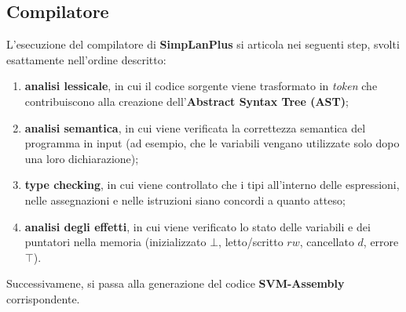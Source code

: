 \documentclass[../../main]{subfiles}
\begin{document}
\subsection{Compilatore}
L'esecuzione del compilatore di \textbf{SimpLanPlus} si articola nei seguenti step, svolti esattamente nell'ordine descritto: 
\begin{enumerate}
    \item \textbf{analisi lessicale}, in cui il codice sorgente viene trasformato in \textit{token} che contribuiscono alla creazione dell'\textbf{Abstract Syntax Tree (AST)};
    \item \textbf{analisi semantica}, in cui viene verificata la correttezza semantica del programma in input (ad esempio, che le variabili vengano utilizzate solo dopo una loro dichiarazione);
    \item \textbf{type checking}, in cui viene controllato che i tipi all'interno delle espressioni, nelle assegnazioni e nelle istruzioni siano concordi a quanto atteso;
    \item \textbf{analisi degli effetti}, in cui viene verificato lo stato delle variabili e dei puntatori nella memoria (inizializzato $\bot$, letto/scritto $rw$, cancellato $d$, errore $\top$).
\end{enumerate}
Successivamene, si passa alla generazione del codice \textbf{SVM-Assembly} corrispondente.
\end{document}
